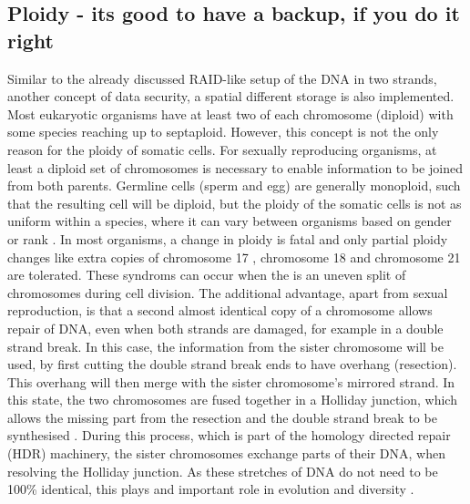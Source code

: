 \subsection[Ploidy]{Ploidy - its good to have a backup, if you do it right}
\label{intro-sec:ploidy}
Similar to the already discussed RAID-like setup of the DNA in two strands, another concept of data security, a spatial different storage is also implemented. Most eukaryotic organisms have at least two of each chromosome (diploid) with some species reaching up to septaploid\cite{Tateoka1975}. However, this concept is not the only reason for the ploidy of somatic cells. For sexually reproducing organisms, at least a diploid set of chromosomes is necessary to enable information to be joined from both parents. Germline cells (sperm and egg) are generally monoploid, such that the resulting cell will be diploid, but the ploidy of the somatic cells is not as uniform within a species, where it can vary between organisms based on gender or rank \cite{Trivers1976}. 
In most organisms, a change in ploidy is fatal \cite{Otto2007} and only partial ploidy changes like extra copies of chromosome 17 \cite{Gottlieb1962}, chromosome 18 \cite{Cereda2012} and chromosome 21 \cite{Hulten2008} are tolerated. These syndroms can occur when the is an uneven split of chromosomes during cell division.
The additional advantage, apart from sexual reproduction, is that a second almost identical copy of a chromosome allows repair of DNA, even when both strands are damaged, for example in a double strand break.
In this case, the information from the sister chromosome will be used, by first cutting the double strand break ends to have overhang (resection). This overhang will then merge with the sister chromosome's mirrored strand. In this state, the two chromosomes are fused together in a Holliday junction, which allows the missing part from the resection and the double strand break to be synthesised \cite{Lilley2000}. During this process, which is part of the homology directed repair (HDR) machinery, the sister chromosomes exchange parts of their DNA, when resolving the Holliday junction. As these stretches of DNA do not need to be 100\% identical, this plays and important role in evolution and diversity \cite{Hanage2006,Kong2013}.

